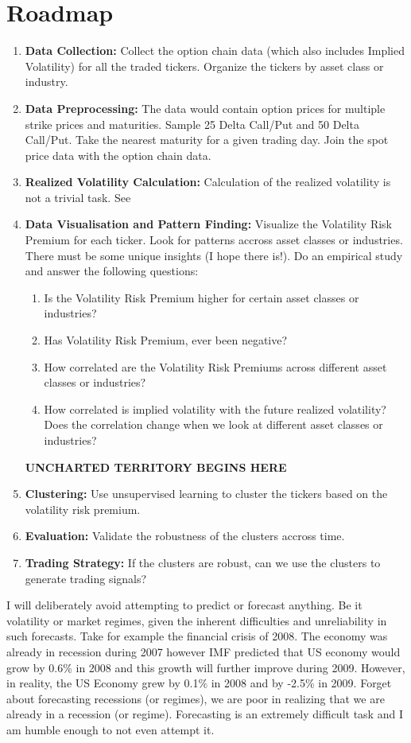 \documentclass{article}[16pt]
\begin{document}
\section{Roadmap}
\begin{enumerate}
    \item \textbf{Data Collection:} Collect the option chain data (which also includes Implied Volatility) for all the traded tickers. Organize the tickers by asset class or industry.
    \item \textbf{Data Preprocessing:} The data would contain option prices for multiple strike prices and maturities. Sample 25 Delta Call/Put and 50 Delta Call/Put. Take the nearest maturity for a given trading day. Join the spot price data with the option chain data.
    \item \textbf{Realized Volatility Calculation:} Calculation of the realized volatility is not a trivial task. See \cite{Corsi2005}
    \item \textbf{Data Visualisation and Pattern Finding:} Visualize the Volatility Risk Premium for each ticker. Look for patterns accross asset classes or industries. There
          must be some unique insights (I hope there is!). Do an empirical study and answer the following questions:
          \begin{enumerate}
              \item Is the Volatility Risk Premium higher for certain asset classes or industries?
              \item Has Volatility Risk Premium, ever been negative?
              \item How correlated are the Volatility Risk Premiums across different asset classes or industries?
              \item How correlated is implied volatility with the future realized volatility? Does the correlation change when we look at different asset classes or industries?
          \end{enumerate}

          \textbf{UNCHARTED TERRITORY BEGINS HERE}
    \item \textbf{Clustering:} Use unsupervised learning to cluster the tickers based on the volatility risk premium.
    \item \textbf{Evaluation:} Validate the robustness of the clusters accross time.
    \item \textbf{Trading Strategy:} If the clusters are robust, can we use the clusters to generate trading signals?
\end{enumerate}
I will deliberately avoid attempting to predict or forecast anything. Be it volatility or market regimes, given the inherent difficulties and unreliability in such forecasts. Take for example the financial crisis of 2008. The economy was already in recession during 2007 however IMF predicted that US economy would grow by 0.6\% in 2008 and this growth will further improve during 2009. However, in reality, the US Economy grew by 0.1\% in 2008 and by -2.5\% in 2009. Forget about forecasting recessions (or regimes), we are poor in realizing that we are already in a recession (or regime). Forecasting is an extremely difficult task and I am humble enough to not even attempt it.
\printbibliography
\end{document}
